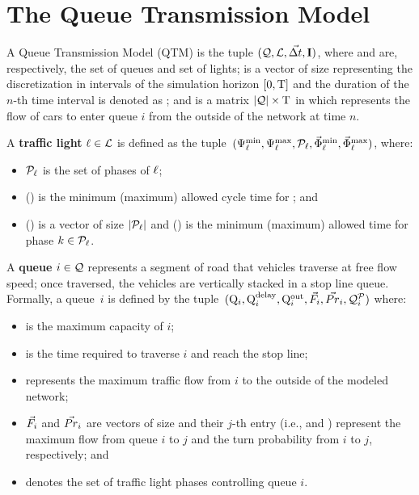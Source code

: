 \section{The Queue Transmission Model}


A Queue Transmission Model (QTM) is the tuple $(\mathcal{Q}, \mathcal{L}, \vec{\Delta t}, \mathbf{I})$,
where \Qset and \Lset are, respectively, the set of queues and set of lights;
%
\vecDT is a vector of size \Nn representing the discretization in intervals of
the simulation horizon $[0,\mathrm{T}]$ and the duration  of the
$n$-th time interval is denoted as \DT[n];
%
%
and \MatQIN is a matrix $|\mathcal{Q}| \times \mathrm{T}$ in which  represents the
flow of cars  to enter queue $i$ from the outside of the network
at time $n$.



A \textbf{traffic light} $\ell \in \mathcal{L}$ is defined as the tuple~$(\mathrm{\Psi}_{\ell}^{\mathrm{min}},
\mathrm{\Psi}_{\ell}^{\mathrm{max}}, \mathcal{P}_\ell, \vec{\mathrm{\Phi}}_{\ell}^{\mathrm{min}}, \vec{\mathrm{\Phi}}_{\ell}^{\mathrm{max}})$, where:

\begin{itemize}
%
\item $\mathcal{P}_\ell$ is the set of phases of $\ell$;
%
\item \CTMIN{\tl} (\CTMAX{\tl}) is the minimum (maximum) allowed cycle time for
  \tl; and
%
\item \VecPTMIN{\tl} (\VecPTMAX{\tl}) is a vector of size $|\mathcal{P}_\ell|$ and
   () is the minimum (maximum) allowed time for
  phase $k \in \mathcal{P}_\ell$. 
%
\end{itemize}


A \textbf{queue} $i \in \mathcal{Q}$ represents a segment of road that vehicles
traverse at free flow speed; once traversed, the vehicles are vertically stacked
in a stop line queue.
%
Formally, a queue~$i$ is defined by the tuple~$(\mathrm{Q}_{i}, \mathrm{Q}_{i}^{\mathrm{delay}}, \mathrm{Q}_{i}^{\mathrm{out}},
\vec{F}_i, \vec{Pr}_i, \mathcal{Q}_{i}^{\mathcal{P}})$ where:

\begin{itemize}
%
\item {} is the maximum capacity of $i$;
%
\item {} is the time required to traverse $i$ and reach the stop line;
%
\item {} represents the maximum traffic flow from $i$ to the outside of the
modeled network;
%
\item $\vec{F}_i$ and $\vec{Pr}_i$ are vectors of size \Qn and their $j$-th entry (i.e.,
 and ) represent the maximum flow from queue $i$ to $j$
and the turn probability from $i$ to $j$, respectively; and
%
\item {} denotes the set of traffic light phases controlling queue $i$.
%
\end{itemize}


